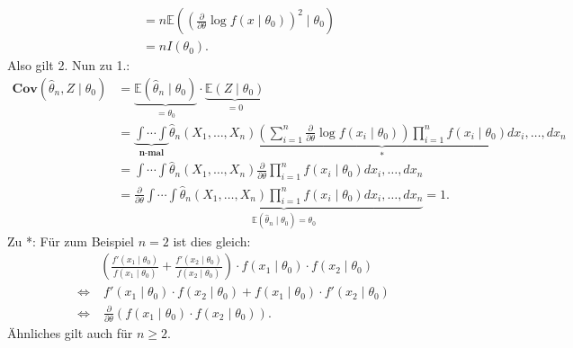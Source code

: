 \documentclass[10pt]{article}
\newcommand{\FZV}{X_1, \ldots, X_n} %
\newcommand{\EW}{\mathbb{E}} %
\newcommand{\ablt}{\frac{\partial}{\partial \theta}}
\newenvironment{BWS}[1][]
{\begin{Beweis}[frametitle=#1]}{\end{Beweis}}
\begin{document}
\begin{BWS}[Beweis 1.4.1 (Effizienz)]
\begin{equation*}
\begin{split}
				&= n\EW\left(\left(\ablt \log f(x \mid \theta_0)\right)^2 \mid \theta_0\right)\\
				&= nI(\theta_0).
			\end{split}
		\end{equation*}
		Also gilt 2. Nun zu 1.:
		\begin{equation*}
			\begin{split}
				\textbf{Cov}(\hat{\theta}_n, Z \mid \theta_0) &= \underbrace{\EW(\hat{\theta}_n \mid \theta_0)}_{= \theta_0} \cdot \underbrace{\EW(Z \mid \theta_0)}_{= 0}\\
				&= \underbrace{\int \cdots \int}_{\textbf{n-mal}}\hat{\theta}_n(\FZV) \underbrace{(\sum_{i=1}^{n}\ablt \log f(x_i \mid \theta_0)) \prod_{i=1}^{n}f(x_i \mid \theta_0)}_{*} dx_i, \ldots, dx_n\\
				&= \int \cdots \int \hat{\theta}_n (\FZV) \ablt \prod_{i=1}^{n} f(x_i \mid \theta_0) dx_i, \ldots, dx_n\\
				&= \ablt \underbrace{\int \cdots \int \hat{\theta}_n(\FZV) \prod_{i=1}^{n} f(x_i \mid \theta_0) dx_i, \ldots, dx_n}_{\EW(\hat{\theta}_n \mid \theta_0) = \theta_0} = 1.
			\end{split}
		\end{equation*}
		Zu *: Für zum Beispiel $n=2$ ist dies gleich:
		\begin{equation*}
			\begin{split}
				&\left(\frac{f'(x_1 \mid \theta_0)}{f(x_1 \mid \theta_0)} + \frac{f'(x_2 \mid \theta_0)}{f(x_2 \mid \theta_0)}\right) \cdot f(x_1 \mid \theta_0) \cdot f(x_2 \mid \theta_0)\\
				\Leftrightarrow & \;f'(x_1 \mid \theta_0) \cdot f(x_2 \mid \theta_0) + f(x_1 \mid \theta_0) \cdot f'(x_2 \mid \theta_0)\\
				\Leftrightarrow & \;\ablt (f(x_1 \mid \theta_0) \cdot f(x_2 \mid \theta_0)).
			\end{split}
		\end{equation*}
		Ähnliches gilt auch für $n \geq 2$.
	\end{BWS}
	
\end{document}

